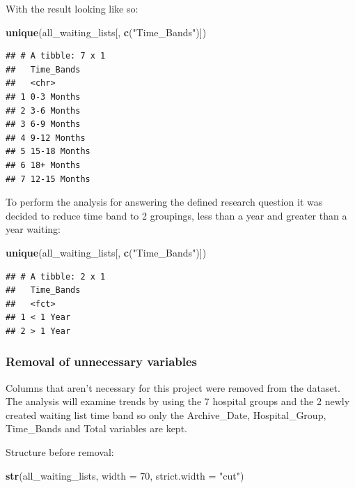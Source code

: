 \documentclass[
  12pt,
]{article}
\newenvironment{Shaded}{\begin{snugshade}}{\end{snugshade}}
\newcommand{\DataTypeTok}[1]{\textcolor[rgb]{0.13,0.29,0.53}{#1}}
\newcommand{\DecValTok}[1]{\textcolor[rgb]{0.00,0.00,0.81}{#1}}
\newcommand{\KeywordTok}[1]{\textcolor[rgb]{0.13,0.29,0.53}{\textbf{#1}}}
\newcommand{\NormalTok}[1]{#1}
\newcommand{\StringTok}[1]{\textcolor[rgb]{0.31,0.60,0.02}{#1}}
\begin{document}
With the result looking like so:
\small

\begin{Shaded}
\begin{Highlighting}[]
\KeywordTok{unique}\NormalTok{(all\_waiting\_lists[, }\KeywordTok{c}\NormalTok{(}\StringTok{"Time\_Bands"}\NormalTok{)])}
\end{Highlighting}
\end{Shaded}

\begin{verbatim}
## # A tibble: 7 x 1
##   Time_Bands  
##   <chr>       
## 1 0-3 Months  
## 2 3-6 Months  
## 3 6-9 Months  
## 4 9-12 Months 
## 5 15-18 Months
## 6 18+ Months  
## 7 12-15 Months
\end{verbatim}

\normalsize

To perform the analysis for answering the defined research question it was decided to reduce time band to 2 groupings, less than a year and greater than a year waiting:
\small

\begin{Shaded}
\begin{Highlighting}[]
\KeywordTok{unique}\NormalTok{(all\_waiting\_lists[, }\KeywordTok{c}\NormalTok{(}\StringTok{"Time\_Bands"}\NormalTok{)])}
\end{Highlighting}
\end{Shaded}

\begin{verbatim}
## # A tibble: 2 x 1
##   Time_Bands
##   <fct>     
## 1 < 1 Year  
## 2 > 1 Year
\end{verbatim}

\normalsize

\hypertarget{removal-of-unnecessary-variables}{%
\subsubsection{Removal of unnecessary variables}\label{removal-of-unnecessary-variables}}

Columns that aren't necessary for this project were removed from the dataset. The analysis will examine trends by using the 7 hospital groups and the 2 newly created waiting list time band so only the Archive\_Date, Hospital\_Group, Time\_Bands and Total variables are kept.

Structure before removal:
\small

\begin{Shaded}
\begin{Highlighting}[]
\KeywordTok{str}\NormalTok{(all\_waiting\_lists, }\DataTypeTok{width =} \DecValTok{70}\NormalTok{, }\DataTypeTok{strict.width =} \StringTok{"cut"}\NormalTok{)}
\end{Highlighting}
\end{Shaded}
\end{document}
